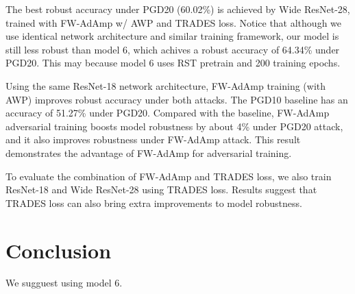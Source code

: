 \documentclass{article}
\begin{document}
            The best robust accuracy under PGD20 (60.02\%) is achieved by Wide ResNet-28, trained with FW-AdAmp w/ AWP and TRADES loss. Notice that although we use identical network architecture and similar training framework, our model is still less robust than model 6, which achives a robust accuracy of 64.34\% under PGD20. This may because model 6 uses RST pretrain and 200 training epochs.
            
            Using the same ResNet-18 network architecture, FW-AdAmp training (with AWP) improves robust accuracy under both attacks. The PGD10 baseline has an accuracy of 51.27\% under PGD20. Compared with the baseline, FW-AdAmp adversarial training boosts model robustness by about 4\% under PGD20 attack, and it also improves robustness under FW-AdAmp attack. This result demonstrates the advantage of FW-AdAmp for adversarial training.

            To evaluate the combination of FW-AdAmp and TRADES loss, we also train ResNet-18 and Wide ResNet-28 using TRADES loss. Results suggest that TRADES loss can also bring extra improvements to model robustness.


\section{Conclusion}\label{sec:Conclusion}
We sugguest using model 6.
\end{document}
